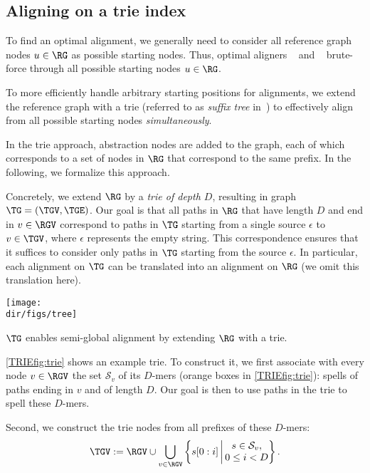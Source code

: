 \subsection{Aligning on a trie index} \label{TRIEsubsec:trie}

To find an optimal alignment, we generally need to consider all reference graph
nodes $u \in \RG$ as possible starting nodes. Thus, optimal aligners
\pasgal~\cite{jain_accelerating_2019} and
\bitparallel~\cite{rautiainen_bitparallel_2019} brute-force through all
possible starting nodes $u \in \RG$.

To more efficiently handle arbitrary starting positions for alignments, we
extend the reference graph with a trie (referred to as \emph{suffix tree}
in~\cite{dox2018efficient}) to effectively align from all possible starting
nodes \emph{simultaneously}.

In the trie approach, abstraction nodes are added to the graph, each of which
corresponds to a set of nodes in $\RG$ that correspond to the same prefix. In
the following, we formalize this approach.

Concretely, we extend $\RG$ by a \emph{trie of depth $D$}, resulting in graph
$\TG=(\TGV,\TGE)$. Our goal is that all paths in $\RG$ that have length $D$ and
end in $v \in \RGV$ correspond to paths in $\TG$ starting from a single source
$\epsilon$ to $v \in \TGV$, where $\epsilon$ represents the empty string. This
correspondence ensures that it suffices to consider only paths in $\TG$ starting
from the source $\epsilon$. In particular, each alignment on $\TG$ can
be translated into an alignment on $\RG$ (we omit this translation
here).

\begin{floatingfigure}[l]{0.5\textwidth}
	\texttt{[image: \\dir/figs/tree]}
	\caption[Indexing the reference with a trie]{$\TG$ enables semi-global alignment by extending $\RG$ with a trie.}
	\label{TRIEfig:trie}
\end{floatingfigure}

\cref{TRIEfig:trie} shows an example trie. To construct it, we first associate with
every node $v \in \RGV$ the set $\mathcal{S}_v$ of its $D$-mers (orange boxes in
\cref{TRIEfig:trie}): spells of paths ending in $v$ and of length $D$. Our goal is
then to use paths in the trie to spell these $D$-mers.

Second, we construct the trie nodes from all prefixes of these $D$-mers:
%
$$ \TGV:= \RGV \cup
\bigcup_{v \in \RGV} \left\{s[0:i] \,\middle|\, \begin{array}{{@{}c@{}}}
	s \in \mathcal{S}_v, \\
	0 \leq i < D
\end{array} \right\}.
$$

